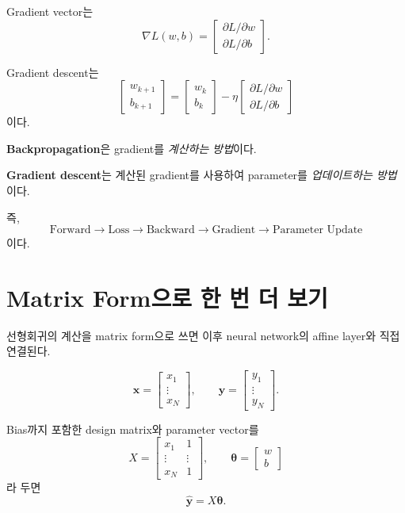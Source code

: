 \documentclass[11pt,a4paper]{article}
\newcommand{\grad}{\nabla}
\newcommand{\vect}[1]{\bm{#1}}
\begin{document}
Gradient vector는
\[
\grad L(w,b)
=
\begin{bmatrix}
\partial L/\partial w\\[0.2em]
\partial L/\partial b
\end{bmatrix}.
\]

Gradient descent는
\[
\boxed{
\begin{bmatrix}
w_{k+1}\\ b_{k+1}
\end{bmatrix}
=
\begin{bmatrix}
w_k\\ b_k
\end{bmatrix}
-
\eta
\begin{bmatrix}
\partial L/\partial w\\
\partial L/\partial b
\end{bmatrix}
}
\]
이다.

\begin{keybox}
\textbf{Backpropagation}은 gradient를 \emph{계산하는 방법}이다.

\textbf{Gradient descent}는 계산된 gradient를 사용하여 parameter를 \emph{업데이트하는 방법}이다.

즉,
\[
\boxed{
\text{Forward}
\rightarrow
\text{Loss}
\rightarrow
\text{Backward}
\rightarrow
\text{Gradient}
\rightarrow
\text{Parameter Update}
}
\]
이다.
\end{keybox}

\section{Matrix Form으로 한 번 더 보기}

선형회귀의 계산을 matrix form으로 쓰면 이후 neural network의 affine layer와 직접 연결된다.

\[
\vect{x}
=
\begin{bmatrix}
x_1\\ \vdots\\ x_N
\end{bmatrix},
\qquad
\vect{y}
=
\begin{bmatrix}
y_1\\ \vdots\\ y_N
\end{bmatrix}.
\]

Bias까지 포함한 design matrix와 parameter vector를
\[
X=
\begin{bmatrix}
x_1&1\\
\vdots&\vdots\\
x_N&1
\end{bmatrix},
\qquad
\vect{\theta}
=
\begin{bmatrix}w\\b\end{bmatrix}
\]
라 두면
\[
\widehat{\vect{y}}=X\vect{\theta}.
\]
\end{document}
